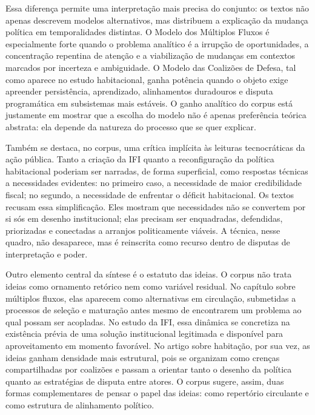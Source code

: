 \documentclass[12pt,a4paper]{article}
\begin{document}
Essa diferença permite uma interpretação mais precisa do conjunto: os textos não apenas descrevem modelos alternativos, mas distribuem a explicação da mudança política em temporalidades distintas. O Modelo dos Múltiplos Fluxos é especialmente forte quando o problema analítico é a irrupção de oportunidades, a concentração repentina de atenção e a viabilização de mudanças em contextos marcados por incerteza e ambiguidade. O Modelo das Coalizões de Defesa, tal como aparece no estudo habitacional, ganha potência quando o objeto exige apreender persistência, aprendizado, alinhamentos duradouros e disputa programática em subsistemas mais estáveis. O ganho analítico do corpus está justamente em mostrar que a escolha do modelo não é apenas preferência teórica abstrata: ela depende da natureza do processo que se quer explicar.\parencite{brasil2022_abordagens_contemporaneas,ferreira2019_politica_habitacional}

Também se destaca, no corpus, uma crítica implícita às leituras tecnocráticas da ação pública. Tanto a criação da IFI quanto a reconfiguração da política habitacional poderiam ser narradas, de forma superficial, como respostas técnicas a necessidades evidentes: no primeiro caso, a necessidade de maior credibilidade fiscal; no segundo, a necessidade de enfrentar o déficit habitacional. Os textos recusam essa simplificação. Eles mostram que necessidades não se convertem por si sós em desenho institucional; elas precisam ser enquadradas, defendidas, priorizadas e conectadas a arranjos politicamente viáveis. A técnica, nesse quadro, não desaparece, mas é reinscrita como recurso dentro de disputas de interpretação e poder.\parencite{anonsd_sem_titulo,ferreira2019_politica_habitacional}

Outro elemento central da síntese é o estatuto das ideias. O corpus não trata ideias como ornamento retórico nem como variável residual. No capítulo sobre múltiplos fluxos, elas aparecem como alternativas em circulação, submetidas a processos de seleção e maturação antes mesmo de encontrarem um problema ao qual possam ser acopladas. No estudo da IFI, essa dinâmica se concretiza na existência prévia de uma solução institucional legitimada e disponível para aproveitamento em momento favorável. No artigo sobre habitação, por sua vez, as ideias ganham densidade mais estrutural, pois se organizam como crenças compartilhadas por coalizões e passam a orientar tanto o desenho da política quanto as estratégias de disputa entre atores. O corpus sugere, assim, duas formas complementares de pensar o papel das ideias: como repertório circulante e como estrutura de alinhamento político.\parencite{brasil2022_abordagens_contemporaneas,anonsd_sem_titulo,ferreira2019_politica_habitacional}
\end{document}

